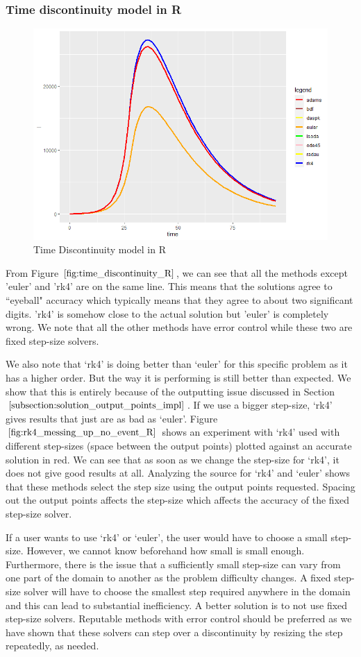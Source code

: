 \subsubsection{Time discontinuity model in R}
\begin{figure}[h]
\centering
\includegraphics[width=0.7\linewidth]{./figures/time_discontinuity_R}
\caption{Time Discontinuity model in R}
\label{fig:time_discontinuity_R}
\end{figure}
From Figure $\ref{fig:time_discontinuity_R}$, we can see that all the methods except 'euler' and 'rk4' are on the same line. This means that the solutions agree to ``eyeball" accuracy which typically means that they agree to about two significant digits. 'rk4' is somehow close to the actual solution but 'euler' is completely wrong. We note that all the other methods have error control while these two are fixed step-size solvers.

We also note that `rk4' is doing better than `euler' for this specific problem as it has a higher order. But the way it is performing is still better than expected. We show that this is entirely because of the outputting issue discussed in Section $\ref{subsection:solution_output_points_impl}$. If we use a bigger step-size, `rk4' gives results that just are as bad as `euler'. Figure $\ref{fig:rk4_messing_up_no_event_R}$ shows an experiment with `rk4' used with different step-sizes (space between the output points) plotted against an accurate solution in red. We can see that as soon as we change the step-size for `rk4', it does not give good results at all. Analyzing the source for `rk4' and `euler' shows that these methods select the step size using the output points requested. Spacing out the output points affects the step-size which affects the accuracy of the fixed step-size solver.

If a user wants to use `rk4' or `euler', the user would have to choose a small step-size. However, we cannot know beforehand how small is small enough. Furthermore, there is the issue that a sufficiently small step-size can vary from one part of the domain to another as the problem difficulty changes. A fixed step-size solver will have to choose the smallest step required anywhere in the domain and this can lead to substantial inefficiency. A better solution is to not use fixed step-size solvers. Reputable methods with error control should be preferred as we have shown that these solvers can step over a discontinuity by resizing the step repeatedly, as needed.

